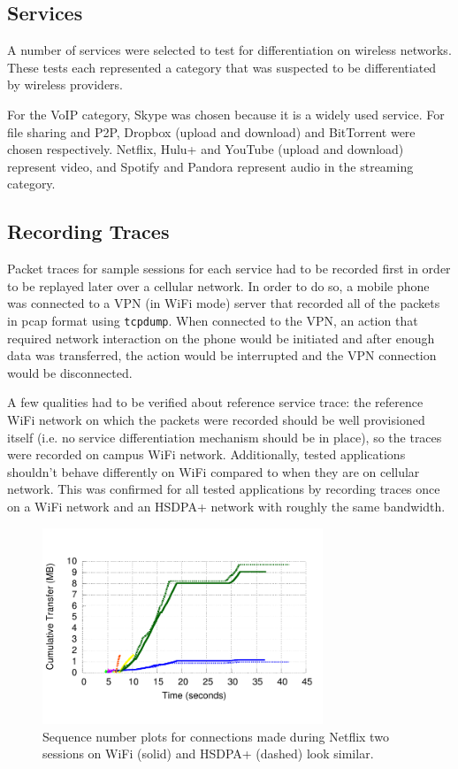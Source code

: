 \documentclass[letterpaper]{sig-alternate-10pt}
\begin{document}
\subsection{Services}

A number of services were selected to test for differentiation on wireless networks. These tests each represented a category that was suspected to be differentiated by wireless providers.

For the VoIP category, Skype was chosen because it is a widely used service. For file sharing and P2P, Dropbox (upload and download) and BitTorrent were chosen respectively. Netflix, Hulu+ and YouTube (upload and download) represent video, and Spotify and Pandora represent audio in the streaming category.
\subsection{Recording Traces}

Packet traces for sample sessions for each service had to be recorded first in order to be replayed later over a cellular network. In order to do so, a mobile phone was connected to a VPN (in WiFi mode) server that recorded all of the packets in pcap format using \texttt{tcpdump}. When connected to the VPN, an action that required network interaction on the phone would be initiated and after enough data was transferred, the action would be interrupted and the VPN connection would be disconnected.

A few qualities had to be verified about reference service trace: the reference WiFi network on which the packets were recorded should be well provisioned itself (i.e. no service differentiation mechanism should be in place), so the traces were recorded on campus WiFi network. Additionally, tested applications shouldn't behave differently on WiFi compared to when they are on cellular network. This was confirmed for all tested applications by recording traces once on a WiFi network and an HSDPA+ network with roughly the same bandwidth.

\begin{figure}[ht]
\centering
\includegraphics[width=3.3in]{figures/netflix_seqnum_wifi_vs_cell}
\caption{Sequence number plots for connections made during Netflix two sessions on WiFi (solid) and HSDPA+ (dashed) look similar.}
\label{fig:nfx_double}
\end{figure}
\end{document}
